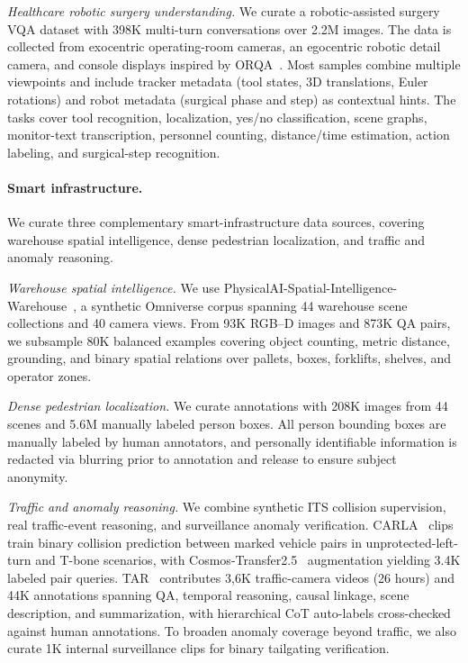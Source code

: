 \textit{Healthcare robotic surgery understanding.}
We curate a robotic-assisted surgery VQA dataset with 398K multi-turn conversations over 2.2M images. The data is collected from exocentric operating-room cameras, an egocentric robotic detail camera, and console displays inspired by ORQA~\citep{ozsoy2025specializedfoundationmodelsintelligent}. Most samples combine multiple viewpoints and include tracker metadata (tool states, 3D translations, Euler rotations) and robot metadata (surgical phase and step) as contextual hints. The tasks cover tool recognition, localization, yes/no classification, scene graphs, monitor-text transcription, personnel counting, distance/time estimation, action labeling, and surgical-step recognition.

\paragraph{Smart infrastructure.}
We curate three complementary smart-infrastructure data sources, covering warehouse spatial intelligence, dense pedestrian localization, and traffic and anomaly reasoning. 

\textit{Warehouse spatial intelligence.} We use PhysicalAI-Spatial-Intelligence-Warehouse~\citep{tang20259thaicitychallenge}, a synthetic Omniverse corpus spanning 44 warehouse scene collections and 40 camera views. From 93K RGB--D images and 873K QA pairs, we subsample 80K balanced examples covering object counting, metric distance, grounding, and binary spatial relations over pallets, boxes, forklifts, shelves, and operator zones.

\textit{Dense pedestrian localization.} We curate annotations with 208K images from 44 scenes and 5.6M manually labeled person boxes. All person bounding boxes are manually labeled by human annotators, and personally identifiable information is redacted via blurring prior to annotation and release to ensure subject anonymity.

\textit{Traffic and anomaly reasoning.} We combine synthetic ITS collision supervision, real traffic-event reasoning, and surveillance anomaly verification. CARLA~\citep{Dosovitskiy17} clips train binary collision prediction between marked vehicle pairs in unprotected-left-turn and T-bone scenarios, with Cosmos-Transfer2.5~\citep{cosmos_predict2p5} augmentation yielding 3.4K labeled pair queries. TAR~\citep{nvidia2026tar} contributes 3{,}6K traffic-camera videos (26 hours) and 44K annotations spanning QA, temporal reasoning, causal linkage, scene description, and summarization, with hierarchical CoT auto-labels cross-checked against human annotations. To broaden anomaly coverage beyond traffic, we also curate 1K internal surveillance clips for binary tailgating verification.